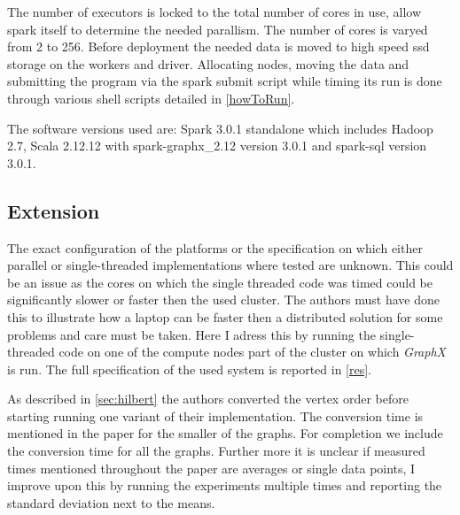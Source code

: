 The number of executors is locked to the total number of cores in use, allow spark itself to determine the needed parallism. The number of cores is varyed from 2 to 256. Before deployment the needed data is moved to high speed ssd storage on the workers and driver. 
Allocating nodes, moving the data and submitting the program via the spark submit script while timing its run is done through various shell scripts detailed in \cref{howToRun}.

The software versions used are: Spark 3.0.1 standalone which includes Hadoop 2.7, Scala 2.12.12 with spark-graphx\_2.12 version 3.0.1 and spark-sql version 3.0.1.

\subsection{Extension}
The exact configuration of the platforms or the specification on which either parallel or single-threaded implementations where tested are unknown. This could be an issue as the cores on which the single threaded code was timed could be significantly slower or faster then the used cluster. The authors must have done this to illustrate how a laptop can be faster then a distributed solution for some problems and care must be taken. Here I adress this by running the single-threaded code on one of the compute nodes part of the cluster on which \textit{GraphX} is run. The full specification of the used system is reported in \cref{res}.

As described in \cref{sec:hilbert} the authors converted the vertex order before starting running one variant of their implementation. The conversion time is mentioned in the paper for the smaller of the graphs. For completion we include the conversion time for all the graphs. 
Further more it is unclear if measured times mentioned throughout the paper are averages or single data points, I improve upon this by running the experiments multiple times and reporting the standard deviation next to the means.
